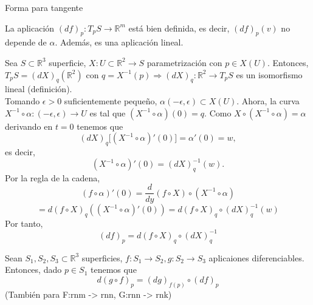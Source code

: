 \begin{obs}
  Forma para tangente
\end{obs}

\begin{prop}
  La aplicación $(d f)_{p} : T_{p}S \to \mathbb{R}^{m}$ está bien definida, es decir, $(d f)_{p}(v)$ no depende de $\alpha$. Además, es una aplicación lineal.
\end{prop}

\begin{dem}
  Sea $S \subset \mathbb{R}^{3}$ superficie, $X : U \subset \mathbb{R}^{2} \to S$ parametrización con $p \in X(U)$. Entonces, $T_{p}S = (d X)_{q}(\mathbb{R}^{2})$ con $q = X^{-1}(p) \Rightarrow (d X)_{q} : \mathbb{R}^{2} \to T_{p}S$ es un isomorfismo lineal (definición).\\

  Tomando $\epsilon > 0$ suficientemente pequeño, $\alpha(-\epsilon, \epsilon) \subset X(U)$. Ahora, la curva $X^{-1} \circ \alpha : (-\epsilon, \epsilon) \to U$ es tal que $(X^{-1} \circ \alpha)(0) = q$. Como $X \circ (X^{-1} \circ \alpha) = \alpha$ derivando en $t = 0 $ tenemos que
  \[
    (d X)_{q}\big[ (X^{-1} \circ \alpha)'(0) \big] = \alpha'(0) = w,
  \]
  es decir,
  \[ 
    (X^{-1} \circ \alpha)'(0) = (d X)_{q}^{-1}(w) .
  \] 
  Por la regla de la cadena,
  \[ 
     (f \circ \alpha)'(0) = \frac{d{}}{d{y}}(f \circ X) \circ (X^{-1} \circ \alpha)
  \] 
  \[ 
    = d(f \circ X)_{q} ((X^{-1} \circ \alpha)'(0)) = d(f \circ X)_{q} \circ (d X)_{q}^{-1}(w)
  \] 
  Por tanto,
  \[ 
    (d f)_{p} = d(f \circ X)_{q} \circ (d X)_{q}^{-1}
  \] 
\end{dem}



\begin{theo}
  Sean $S_{1}, S_{2}, S_{3} \subset \mathbb{R}^{3}$ superficies, $f : S_{1} \to S_{2}, g : S_{2} \to S_{3}$ aplicaiones diferenciables. Entonces, dado $p \in S_{1}$ tenemos que
  \[ 
    d(g \circ f)_{p} = (d g)_{f(p)} \circ (d f)_{p}
  \] 
  (También para F:rnm -> rnn, G:rnn -> rnk)
\end{theo}

